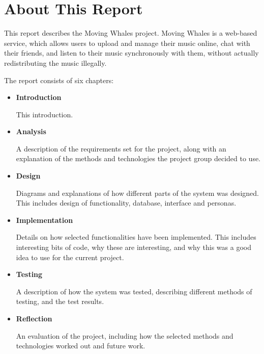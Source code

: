 \section{About This Report}
This report describes the Moving Whales project. Moving Whales is a web-based
service, which allows users to upload and manage their music online, chat with
their friends, and listen to their music synchronously with them, without
actually redistributing the music illegally.

The report consists of six chapters:
\begin{itemize}
  \item{\textbf{Introduction}}
  
  This introduction.
  \item{\textbf{Analysis}}
  
  A description of the requirements set for the project, along with an explanation
  of the methods and technologies the project group decided to use.
  \item{\textbf{Design}}
  
  Diagrams and explanations of how different parts of the system was designed.
  This includes design of functionality, database, interface and personas.
  \item{\textbf{Implementation}}
  
  Details on how selected functionalities have been implemented. This includes
  interesting bits of code, why these are interesting, and why this was a good
  idea to use for the current project.
  \item{\textbf{Testing}}
  
  A description of how the system was tested, describing different methods of
  testing, and the test results.
  \item{\textbf{Reflection}}
  
  An evaluation of the project, including how the selected methods and
  technologies worked out and future work.
\end{itemize}